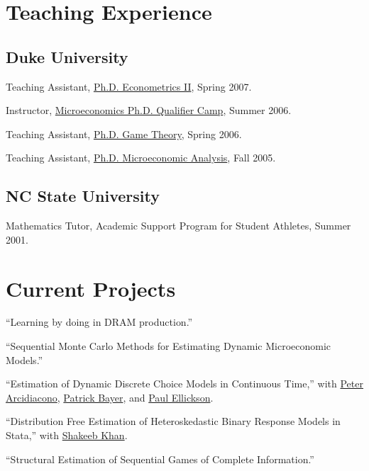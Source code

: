 \documentclass[11pt,letterpaper]{article}
\renewenvironment{itemize}{
  \begin{list}{}
    { \setlength{\itemsep}{5pt}
      \setlength{\parsep}{0pt}
      \setlength{\topsep}{0pt}
      \setlength{\leftmargin}{0em} } }{
  \end{list}}
\begin{document}
\section*{Teaching Experience}

\subsection*{Duke University}

\begin{itemize}
\item Teaching Assistant,
  \href{http://jblevins.org/courses/econ342s07}{Ph.D. Econometrics II},
  Spring 2007.
\item Instructor,
  \href{http://jblevins.org/courses/qualcamp06}{Microeconomics Ph.D. Qualifier Camp},
  Summer 2006.
\item Teaching Assistant,
  \href{http://jblevins.org/courses/econ302s06}{Ph.D. Game Theory},
  Spring 2006.
\item Teaching Assistant,
  \href{http://jblevins.org/courses/econ301f05}{Ph.D. Microeconomic Analysis},
  Fall 2005.
\end{itemize}

\subsection*{NC State University}

\begin{itemize}
\item Mathematics Tutor, Academic Support Program for Student Athletes,
  Summer 2001.
\end{itemize}


\section*{Current Projects}

\begin{itemize}
\item ``Learning by doing in DRAM production.''
\item ``Sequential Monte Carlo Methods for Estimating Dynamic
  Microeconomic Models.''
\item ``Estimation of Dynamic Discrete Choice Models in Continuous
  Time,'' with
  \href{http://www.econ.duke.edu/~psarcidi/}{Peter Arcidiacono},
  \href{http://www.econ.duke.edu/~pb29/}{Patrick Bayer}, and
  \href{http://www.econ.duke.edu/~paule/}{Paul Ellickson}.
\item ``Distribution Free Estimation of Heteroskedastic Binary Response
  Models in Stata,'' with
  \href{http://www.econ.duke.edu/~shakeebk/}{Shakeeb Khan}.
\item ``Structural Estimation of Sequential Games of Complete
  Information.''
\end{itemize}
\end{document}
